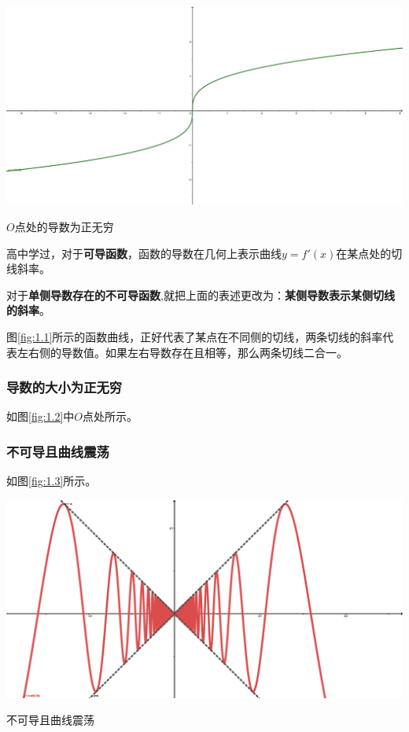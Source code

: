 \begin{marginfigure}[7em]
	\includegraphics[width=\marginparwidth]{figures/2.eps}
	\caption{$O$点处的导数为正无穷}
	\label{fig:1.2}
\end{marginfigure}

高中学过，对于\textbf{可导函数}，函数的导数在几何上表示曲线$y=f'(x)$在某点处的切线斜率。

对于\textbf{单侧导数存在的不可导函数},就把上面的表述更改为：\textbf{某侧导数表示某侧切线的斜率}。

图\ref{fig:1.1}所示的函数曲线，正好代表了某点在不同侧的切线，两条切线的斜率代表左右侧的导数值。如果左右导数存在且相等，那么两条切线二合一。

\subsubsection{导数的大小为正无穷}\label{sec:1.2.1.2}

如图\ref{fig:1.2}中$O$点处所示。

\subsubsection{不可导且曲线震荡}\label{sec:1.2.1.3}

如图\ref{fig:1.3}所示。

\begin{marginfigure}[7em]
	\includegraphics[width=\marginparwidth]{figures/3.eps}
	\caption{不可导且曲线震荡}
	\label{fig:1.3}
\end{marginfigure}

